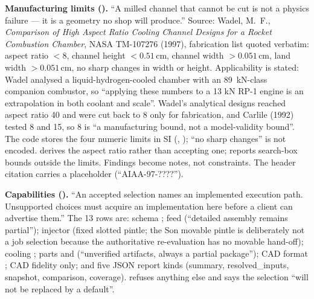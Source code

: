 \textbf{Manufacturing limits ().} ``A milled channel that cannot be cut is not a physics failure --- it is a geometry no shop will produce.'' Source: Wadel, M.~F., \emph{Comparison of High Aspect Ratio Cooling Channel Designs for a Rocket Combustion Chamber}, NASA TM-107276 (1997), fabrication list quoted verbatim: aspect ratio $< 8$, channel height $< 0.51\,$cm, channel width $> 0.051\,$cm, land width $> 0.051\,$cm, no sharp changes in width or height. Applicability is stated: Wadel analysed a liquid-hydrogen-cooled chamber with an 89~kN-class companion combustor, so ``applying these numbers to a 13 kN RP-1 engine is an extrapolation in both coolant and scale''. Wadel's analytical designs reached aspect ratio 40 and were cut back to 8 only for fabrication, and Carlile (1992) tested 8 and 15, so 8 is ``a manufacturing bound, not a model-validity bound''. The code stores the four numeric limits in SI (, ); ``no sharp changes'' is not encoded.  derives the aspect ratio rather than accepting one;  reports search-box bounds outside the limits. Findings become notes, not constraints. The header citation carries a placeholder (``AIAA-97-????'').

\textbf{Capabilities ().} ``An accepted selection names an implemented execution path. Unsupported choices must acquire an implementation here before a client can advertise them.'' The 13 rows are: schema ; feed  (``detailed assembly remains partial''); injector  (fixed slotted pintle; the Son movable pintle is deliberately not a job selection because the authoritative re-evaluation has no movable hand-off); cooling ; parts  and  (``unverified artifacts, always a partial package''); CAD format ; CAD fidelity  only; and five JSON report kinds (summary, resolved\_inputs, snapshot, comparison, coverage).  refuses anything else and says the selection ``will not be replaced by a default''.

